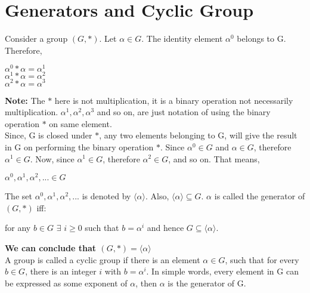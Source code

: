 \documentclass[11pt]{article}
\begin{document}
\section{Generators and Cyclic Group}
Consider a group $(G, *)$. Let $\alpha \in G$. The identity element $\alpha^0$ belongs to G. Therefore,
\begin{center}
    $\alpha^0 * \alpha = \alpha^1$\\
    \vspace{1mm}
    $\alpha^1 * \alpha = \alpha^2$\\
    \vspace{1mm}
    $\alpha^2 * \alpha = \alpha^3$\\
\end{center}
\textbf{Note: }The $*$ here is not multiplication, it is a binary operation not necessarily multiplication. $\alpha^1, \alpha^2, \alpha^3$ and so on, are just notation of using the binary operation $*$ on same element. \\
\vspace{5mm}
Since, G is closed under $*$, any two elements belonging to G, will give the result in G on performing the binary operation $*$. Since $\alpha^0 \in G$ and $\alpha \in G$, therefore $\alpha^1 \in G$. Now, since $\alpha^1 \in G$, therefore $\alpha^2 \in G$, and so on. That means,
\begin{center}
    $\alpha^0, \alpha^1, \alpha^2, ... \in G$
\end{center}
The set $\alpha^0, \alpha^1, \alpha^2, ...$ is denoted by $\langle \alpha \rangle$. Also, $\langle \alpha \rangle \subseteq G$. $\alpha$ is called the generator of $(G, *)$ iff:
\begin{center}
    for any $b \in G$ $\exists$ $i \geq 0$ such that $b = \alpha^i$ and hence $G \subseteq \langle \alpha \rangle $. 
\end{center}
\textbf{We can conclude that $(G,*) = \langle \alpha \rangle $}\\
A group is called a cyclic group if there is an element $\alpha \in G$, such that for every $b \in G$, there is an integer $i$ with $b = \alpha^i$. In simple words, every element in G can be expressed as some exponent of $\alpha$, then $\alpha$ is the generator of G.
\vspace{3mm}
\end{document}
